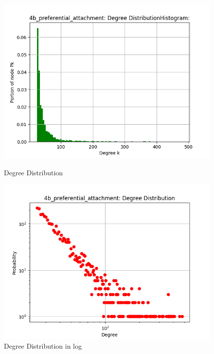 \documentclass[runningheads]{llncs}
\begin{document}
\begin{figure}
    \centering
    \begin{minipage}{0.5\textwidth}
        \centering
        \includegraphics[width=\textwidth]{4b_preferential_attachment_Degree_dist_hist} %
        \caption{Degree Distribution}
        \label{fig_4b_pa_degreedist_hist}
    \end{minipage}\hfill
    \begin{minipage}{0.5\textwidth}
        \centering
        \includegraphics[width=\textwidth]{4b_preferential_attachment_Degree_dist_log} %
        \caption{Degree Distribution in log}
        \label{fig_4b_pa_degreedist_log}
    \end{minipage}
\end{figure}
\end{document}
